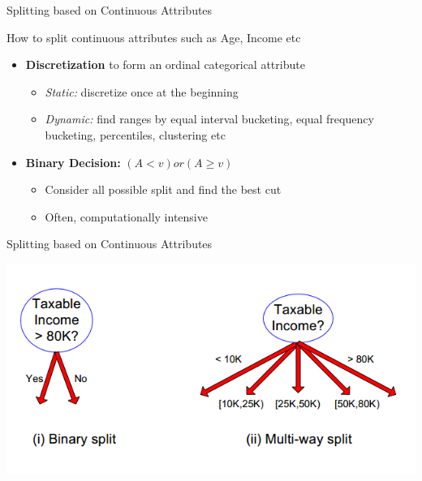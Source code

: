\documentclass{beamer}
\begin{document}
\begin{frame}{Splitting based on Continuous Attributes}

    How to split continuous attributes such as Age, Income etc
    \pause 
    \begin{itemize}
        \item {\bf Discretization} to form an ordinal categorical attribute
        \begin{itemize}
            \item {\em Static:} discretize once at the beginning
            \item {\em Dynamic:} find ranges by equal interval bucketing, equal frequency bucketing, percentiles, clustering etc
        \end{itemize}
        \item {\bf Binary Decision:} $ (A < v) or (A \geq v)$
        \begin{itemize}
            \item Consider all possible split and find the best cut
            \item Often, computationally intensive
        \end{itemize}
    \end{itemize}
\end{frame}
\begin{frame}{Splitting based on Continuous Attributes}
    \begin{center}
        \includegraphics[scale=0.5]{splittingContAttr.png}
    \end{center}
\end{frame}
\end{document}
